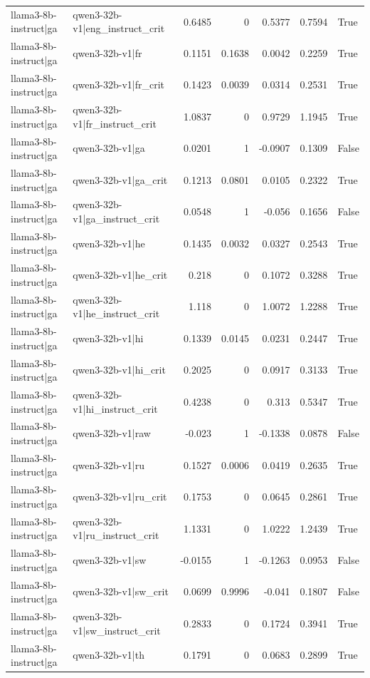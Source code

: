 \begin{table}
\begin{tabular}{l l r r r r l}
llama3-8b-instruct|ga & qwen3-32b-v1|eng_instruct_crit & 0.6485 & 0 & 0.5377 & 0.7594 & True \\
llama3-8b-instruct|ga & qwen3-32b-v1|fr & 0.1151 & 0.1638 & 0.0042 & 0.2259 & True \\
llama3-8b-instruct|ga & qwen3-32b-v1|fr_crit & 0.1423 & 0.0039 & 0.0314 & 0.2531 & True \\
llama3-8b-instruct|ga & qwen3-32b-v1|fr_instruct_crit & 1.0837 & 0 & 0.9729 & 1.1945 & True \\
llama3-8b-instruct|ga & qwen3-32b-v1|ga & 0.0201 & 1 & -0.0907 & 0.1309 & False \\
llama3-8b-instruct|ga & qwen3-32b-v1|ga_crit & 0.1213 & 0.0801 & 0.0105 & 0.2322 & True \\
llama3-8b-instruct|ga & qwen3-32b-v1|ga_instruct_crit & 0.0548 & 1 & -0.056 & 0.1656 & False \\
llama3-8b-instruct|ga & qwen3-32b-v1|he & 0.1435 & 0.0032 & 0.0327 & 0.2543 & True \\
llama3-8b-instruct|ga & qwen3-32b-v1|he_crit & 0.218 & 0 & 0.1072 & 0.3288 & True \\
llama3-8b-instruct|ga & qwen3-32b-v1|he_instruct_crit & 1.118 & 0 & 1.0072 & 1.2288 & True \\
llama3-8b-instruct|ga & qwen3-32b-v1|hi & 0.1339 & 0.0145 & 0.0231 & 0.2447 & True \\
llama3-8b-instruct|ga & qwen3-32b-v1|hi_crit & 0.2025 & 0 & 0.0917 & 0.3133 & True \\
llama3-8b-instruct|ga & qwen3-32b-v1|hi_instruct_crit & 0.4238 & 0 & 0.313 & 0.5347 & True \\
llama3-8b-instruct|ga & qwen3-32b-v1|raw & -0.023 & 1 & -0.1338 & 0.0878 & False \\
llama3-8b-instruct|ga & qwen3-32b-v1|ru & 0.1527 & 0.0006 & 0.0419 & 0.2635 & True \\
llama3-8b-instruct|ga & qwen3-32b-v1|ru_crit & 0.1753 & 0 & 0.0645 & 0.2861 & True \\
llama3-8b-instruct|ga & qwen3-32b-v1|ru_instruct_crit & 1.1331 & 0 & 1.0222 & 1.2439 & True \\
llama3-8b-instruct|ga & qwen3-32b-v1|sw & -0.0155 & 1 & -0.1263 & 0.0953 & False \\
llama3-8b-instruct|ga & qwen3-32b-v1|sw_crit & 0.0699 & 0.9996 & -0.041 & 0.1807 & False \\
llama3-8b-instruct|ga & qwen3-32b-v1|sw_instruct_crit & 0.2833 & 0 & 0.1724 & 0.3941 & True \\
llama3-8b-instruct|ga & qwen3-32b-v1|th & 0.1791 & 0 & 0.0683 & 0.2899 & True \\

\end{tabular}
\end{table}
